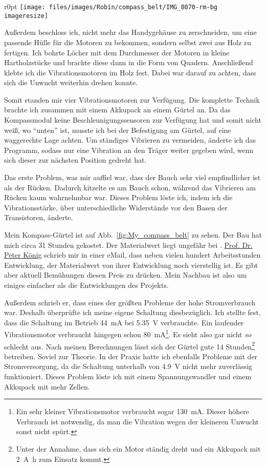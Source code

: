 \begin{wrapfigure}{r}{0pt}
	\texttt{[image: files/images/Robin/compass\_belt/IMG\_8070-rm-bg\\imageresize]}
	\label{fig:motors_compass_belt}
\end{wrapfigure}
Außerdem beschloss ich,
nicht mehr das Handygehäuse zu zerschneiden, um eine passende Hülle für die
Motoren zu bekommen, sondern selbst zwei aus Holz zu fertigen. Ich bohrte Löcher mit dem Durchmesser
der
Motoren in kleine Hartholzstücke und brachte diese dann in die Form von Quadern. Anschließend klebte ich
die Vibrationsmotoren im Holz fest. Dabei war darauf zu achten, dass sich die Unwucht weiterhin drehen
konnte.

Somit standen mir vier Vibrationsmotoren zur Verfügung.
Die komplette Technik brachte ich zusammen mit einem Akkupack
an einem Gürtel an. Da das Kompassmodul keine Beschleunigungssensoren zur Verfügung hat und somit
nicht weiß, wo \enquote{unten} ist, musste ich bei der Befestigung am Gürtel, auf eine waggerechte
Lage achten. Um ständiges Vibrieren zu vermeiden, änderte ich das Programm, sodass
nur eine Vibration an den Träger weiter gegeben wird, wenn sich dieser zur nächsten Position gedreht
hat.

Das erste Problem, was mir auffiel war, dass der Bauch sehr viel empfindlicher ist als der Rücken.
Dadurch kitzelte es am Bauch schon, während das Vibrieren am Rücken kaum wahrnehmbar war. Dieses
Problem löste ich, indem ich die Vibrationsstärke, über unterschiedliche Widerstände
vor den Basen der Transistoren, änderte.

Mein Kompass-Gürtel ist auf Abb.~\vref{fig:My_compass_belt} zu sehen. Der Bau hat mich circa 31
Stunden gekostet. Der Materialwert liegt ungefähr bei .
\href{http://www.cogsci.uni-osnabrueck.de/NBP/peterhome.html}%
{Prof. Dr. Peter König} schrieb mir
in einer eMail, dass neben vielen hundert Arbeitsstunden Entwicklung, der Materialwert
von ihrer Entwicklung noch vierstellig ist.
Es gibt aber aktuell Bemühungen diesen Preis zu drücken.
Mein Nachbau ist also um einiges einfacher als die Entwicklungen des \Linkfeelspace{} Projekts.

Außerdem schrieb er, dass eines der größten Probleme der hohe Stromverbrauch war. Deshalb überprüfte
ich meine eigene Schaltung diesbezüglich. Ich stellte fest, dass die Schaltung im Betrieb
\SI{44}{\milli\ampere} bei \SI{5,35}{\volt} verbrauchte. Ein laufender Vibrationsmotor verbraucht
hingegen schon \SI{80}{\milli\ampere}\footnote{Ein sehr kleiner Vibrationsmotor verbraucht sogar
\SI{130}{\milli\ampere}. Dieser höhere Verbrauch ist notwendig, da man die Vibration wegen der
kleineren Unwucht sonst nicht spürt.}.
Es sieht also gar nicht \emph{so} schlecht aus. Nach meinen Berechnungen lässt sich der Gürtel
gute 14 Stunden\footnote{Unter der Annahme, dass sich ein Motor ständig dreht und ein Akkupack mit
\SI{2}{\ampere\hour} zum Einsatz kommt.} betreiben.
Soviel zur Theorie. In der Praxis hatte ich ebenfalls Probleme mit der Stromversorgung, da die Schaltung
unterhalb von \SI{4,9}{\volt} nicht mehr zuverlässig funktioniert.
Dieses Problem löste ich mit einem Spannungswandler und einem Akkupack mit mehr Zellen.

